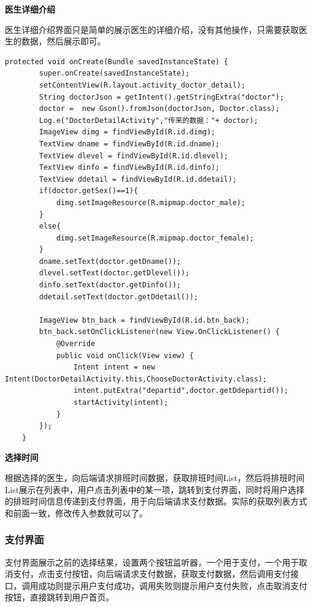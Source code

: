 \documentclass[UTF8,12pt]{article}
\begin{document}
\textbf{医生详细介绍}

医生详细介绍界面只是简单的展示医生的详细介绍，没有其他操作，只需要获取医生的数据，然后展示即可。

\begin{lstlisting}[frame=shadowbox]
    protected void onCreate(Bundle savedInstanceState) {
        super.onCreate(savedInstanceState);
        setContentView(R.layout.activity_doctor_detail);
        String doctorJson = getIntent().getStringExtra("doctor");
        doctor =  new Gson().fromJson(doctorJson, Doctor.class);
        Log.e("DoctorDetailActivity","传来的数据："+ doctor);
        ImageView dimg = findViewById(R.id.dimg);
        TextView dname = findViewById(R.id.dname);
        TextView dlevel = findViewById(R.id.dlevel);
        TextView dinfo = findViewById(R.id.dinfo);
        TextView ddetail = findViewById(R.id.ddetail);
        if(doctor.getSex()==1){
            dimg.setImageResource(R.mipmap.doctor_male);
        }
        else{
            dimg.setImageResource(R.mipmap.doctor_female);
        }
        dname.setText(doctor.getDname());
        dlevel.setText(doctor.getDlevel());
        dinfo.setText(doctor.getDinfo());
        ddetail.setText(doctor.getDdetail());

        ImageView btn_back = findViewById(R.id.btn_back);
        btn_back.setOnClickListener(new View.OnClickListener() {
            @Override
            public void onClick(View view) {
                Intent intent = new Intent(DoctorDetailActivity.this,ChooseDoctorActivity.class);
                intent.putExtra("departid",doctor.getDdepartid());
                startActivity(intent);
            }
        });
    }
\end{lstlisting}

\textbf{选择时间}

根据选择的医生，向后端请求排班时间数据，获取排班时间List，然后将排班时间List展示在列表中，用户点击列表中的某一项，跳转到支付界面，同时将用户选择的排班时间信息传递到支付界面，用于向后端请求支付数据。实际的获取列表方式和前面一致，修改传入参数就可以了。

\subsubsection{支付界面}
支付界面展示之前的选择结果，设置两个按钮监听器，一个用于支付，一个用于取消支付，点击支付按钮，向后端请求支付数据，获取支付数据，然后调用支付接口，调用成功则提示用户支付成功，调用失败则提示用户支付失败，点击取消支付按钮，直接跳转到用户首页。
\end{document}
